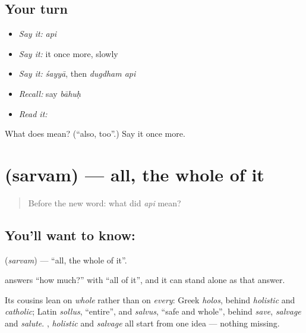 \subsection*{Your turn}
\begin{itemize}
\raggedright
  \item \emph{Say it:} \emph{api}
  \item \emph{Say it:} it once more, slowly
  \item \emph{Say it:} \emph{śayyā}, then \emph{dugdham api}
  \item \emph{Recall:} say \emph{bāhuḥ}
  \item \emph{Read it:} \textbf{}
\end{itemize}

\begin{tcolorbox}[breakable,colback=teal!4,colframe=teal!35!black,title={Before you move on}]
What does  mean? (\textquotedblleft{}also, too\textquotedblright{}.) Say it once more.
\end{tcolorbox}
\section[\texorpdfstring{\sk{सर्वम्} (sarvam)}{सर्वम् (sarvam)}]{ (sarvam) — all, the whole of it}

\label{lesson:SA-C36-all}



\begin{quote}
Before the new word: what did \emph{api} mean?
\end{quote}

\subsection*{You'll want to know: }
\textbf{} (\emph{sarvam}) — \textquotedblleft{}all, the whole of it\textquotedblright{}.

\textbf{} answers \textquotedblleft{}how much?\textquotedblright{} with \textquotedblleft{}all of it\textquotedblright{}, and it can stand alone as that answer.

Its cousins lean on \emph{whole} rather than on \emph{every}: Greek \emph{holos}, behind \emph{holistic} and \emph{catholic}; Latin \emph{sollus}, \textquotedblleft{}entire\textquotedblright{}, and \emph{salvus}, \textquotedblleft{}safe and whole\textquotedblright{}, behind \emph{save}, \emph{salvage} and \emph{salute}. \textbf{}, \emph{holistic} and \emph{salvage} all start from one idea — nothing missing.

